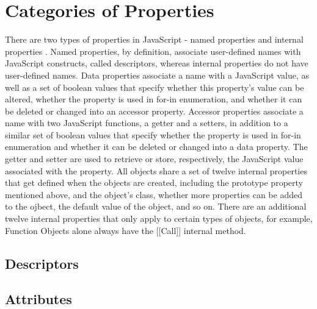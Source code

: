 \documentclass[a4paper,11pt,twoside]{report}
\begin{document}
\section{Categories of Properties}
There are two types of properties in JavaScript - named properties and internal properties \cite{EcmaScript}. Named properties, by definition, associate user-defined names with JavaScript constructs, called descriptors, whereas internal properties do not have user-defined names. Data properties associate a name with a JavaScript value, as well as a set of boolean values that specify whether this property's value can be altered, whether the property is used in for-in enumeration, and whether it can be deleted or changed into an accessor property. Accessor properties associate a name with two JavaScript functions, a getter and a setters, in addition to a similar set of boolean values that specify whether the property is used in for-in enumeration and whether it can be deleted or changed into a data property. The getter and setter are used to retrieve or store, respectively, the JavaScript value associated with the property. All objects share a set of twelve internal properties that get defined when the objects are created, including the prototype property mentioned above, and the object's class, whether more properties can be added to the ojbect, the default value of the object, and so on. There are an additional twelve internal properties that only apply to certain types of objects, for example, Function Objects alone always have the [[Call]] internal method.

\subsection{Descriptors}

\subsection{Attributes}
\end{document}
